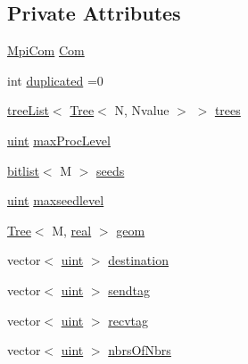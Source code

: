 \subsection*{Private Attributes}
\begin{DoxyCompactItemize}
\item 
\mbox{\hyperlink{structMpiCom}{Mpi\+Com}} \mbox{\hyperlink{classTemplateForest_a98136f14aec33e243ff65b68b89c5fdc}{Com}}
\item 
int \mbox{\hyperlink{classTemplateForest_a97bc83d3ecc6492e272230f00fb0b9f5}{duplicated}} =0
\item 
\mbox{\hyperlink{templateForest_8h_a7d5792f6e45225030ac74c936ce3b700}{tree\+List}}$<$ \mbox{\hyperlink{classTree}{Tree}}$<$ N, Nvalue $>$ $>$ \mbox{\hyperlink{classTemplateForest_a0399f34c2a5a887fc994657d128860bb}{trees}}
\item 
\mbox{\hyperlink{definitions_8h_a69aa29b598b851b0640aa225a9e5d61d}{uint}} \mbox{\hyperlink{classTemplateForest_ae3282ab0b3800e3f4c8b1fcfb9a6246e}{max\+Proc\+Level}}
\item 
\mbox{\hyperlink{definitions_8h_ad1cc49840e065ce2a93cd243916d310c}{bitlist}}$<$ M $>$ \mbox{\hyperlink{classTemplateForest_a00983bdc218abbf105f872e3d2187e8a}{seeds}}
\item 
\mbox{\hyperlink{definitions_8h_a69aa29b598b851b0640aa225a9e5d61d}{uint}} \mbox{\hyperlink{classTemplateForest_acde2c3f1395094ba171138b58b6eb335}{maxseedlevel}}
\item 
\mbox{\hyperlink{classTree}{Tree}}$<$ M, \mbox{\hyperlink{definitions_8h_aedc0ad84d1e764530814f57ad931d02a}{real}} $>$ \mbox{\hyperlink{classTemplateForest_a63125f7155297d70f8f189ffb17c9822}{geom}}
\item 
vector$<$ \mbox{\hyperlink{definitions_8h_a69aa29b598b851b0640aa225a9e5d61d}{uint}} $>$ \mbox{\hyperlink{classTemplateForest_a31344621cbe88d961bdb70174ce8bbc9}{destination}}
\item 
vector$<$ \mbox{\hyperlink{definitions_8h_a69aa29b598b851b0640aa225a9e5d61d}{uint}} $>$ \mbox{\hyperlink{classTemplateForest_ae38bc6bd6cce20a9e93c5d854bca2a18}{sendtag}}
\item 
vector$<$ \mbox{\hyperlink{definitions_8h_a69aa29b598b851b0640aa225a9e5d61d}{uint}} $>$ \mbox{\hyperlink{classTemplateForest_ab3c00d6a664a6194e6ce9c2f962feb56}{recvtag}}
\item 
vector$<$ \mbox{\hyperlink{definitions_8h_a69aa29b598b851b0640aa225a9e5d61d}{uint}} $>$ \mbox{\hyperlink{classTemplateForest_a36aededebe33b6c43e713b9fa93e9a14}{nbrs\+Of\+Nbrs}}
\item 

\end{DoxyCompactItemize}
